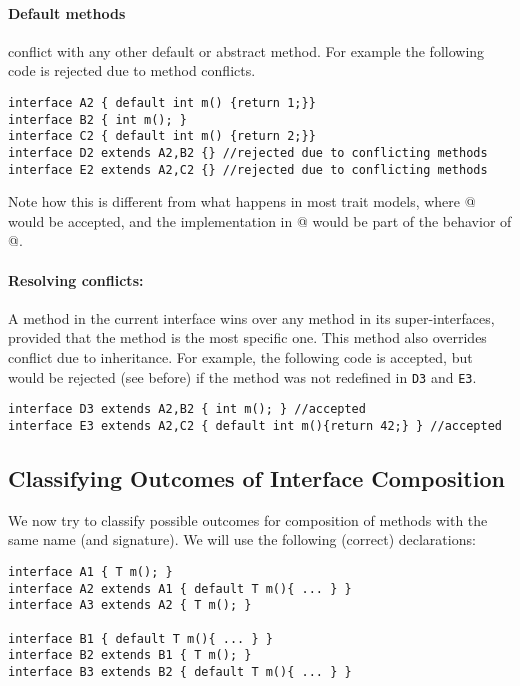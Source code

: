 \paragraph{Default methods} conflict with any other default or abstract method. For
  example the following code is rejected due to method conflicts.
\begin{lstlisting}
interface A2 { default int m() {return 1;}}
interface B2 { int m(); }
interface C2 { default int m() {return 2;}}
interface D2 extends A2,B2 {} //rejected due to conflicting methods
interface E2 extends A2,C2 {} //rejected due to conflicting methods
\end{lstlisting}
Note how this is different from what happens in most trait models, where @
would be accepted, and the implementation in @ would be part of the
behavior of @.

\paragraph{Resolving conflicts:}
A method in the current interface wins over any method in its
super-interfaces, provided that the method
is the most specific one. This method also overrides conflict due to
inheritance. For example, the following code is accepted, but would be rejected
(see before) if the method \Q@m@ was not redefined in \texttt{D3} and
\texttt{E3}.
\begin{lstlisting}
interface D3 extends A2,B2 { int m(); } //accepted
interface E3 extends A2,C2 { default int m(){return 42;} } //accepted
\end{lstlisting}

\subsection{Classifying Outcomes of Interface Composition}
%
We now try to classify possible outcomes for composition of methods with the same name (and
signature).
We will use the following (correct) declarations:
\begin{lstlisting}
interface A1 { T m(); }
interface A2 extends A1 { default T m(){ ... } }
interface A3 extends A2 { T m(); }

interface B1 { default T m(){ ... } }
interface B2 extends B1 { T m(); }
interface B3 extends B2 { default T m(){ ... } }
\end{lstlisting}

